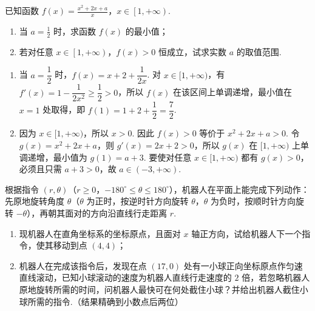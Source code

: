 \begin{problem}
已知函数 \(f(x)=\frac{x^2+2x+a}{x}\)，\(x\in\left[1,+\infty\right)\).
\begin{enumerate}
\item 当 \(a=\frac{1}{2}\) 时，求函数 \(f(x)\) 的最小值；
\item 若对任意 \(x\in\left[1,+\infty\right)\)，\(f(x)>0\) 恒成立，试求实数 \(a\) 的取值范围.
\end{enumerate}
\end{problem}

\begin{solution}
\begin{enumerate}
\item 当 \(a=\dfrac12\) 时，\(f(x)=x+2+\dfrac{1}{2x}\). 对 \(x\in[1,+\infty)\)，有 \(f'(x)=1-\dfrac{1}{2x^2}\geqslant\dfrac12>0\)，所以 \(f(x)\) 在该区间上单调递增，最小值在 \(x=1\) 处取得，即 \(f(1)=1+2+\dfrac12=\dfrac72\).
\item 因为 \(x\in[1,+\infty)\)，所以 \(x>0\). 因此 \(f(x)>0\) 等价于 \(x^2+2x+a>0\). 令 \(g(x)=x^2+2x+a\)，则 \(g'(x)=2x+2>0\)，所以 \(g(x)\) 在 \([1,+\infty)\) 上单调递增，最小值为 \(g(1)=a+3\). 要使对任意 \(x\in[1,+\infty)\) 都有 \(g(x)>0\)，必须且只需 \(a+3>0\)，故 \(a\in(-3,+\infty)\).
\end{enumerate}
\end{solution}

\begin{problem}
根据指令 \((r,\theta)\)（\(r\geqslant 0\)，\(-180^{\circ}\leqslant \theta\leqslant 180^{\circ}\)），机器人在平面上能完成下列动作：先原地旋转角度 \(\theta\)（\(\theta\) 为正时，按逆时针方向旋转 \(\theta\)，\(\theta\) 为负时，按顺时针方向旋转 \(-\theta\)），再朝其面对的方向沿直线行走距离 \(r\).
\begin{enumerate}
\item 现机器人在直角坐标系的坐标原点，且面对 \(x\) 轴正方向，试给机器人下一个指令，使其移动到点 \((4,4)\)；
\item 机器人在完成该指令后，发现在点 \((17,0)\) 处有一小球正向坐标原点作匀速直线滚动，已知小球滚动的速度为机器人直线行走速度的 \(2\) 倍，若忽略机器人原地旋转所需的时间，问机器人最快可在何处截住小球？并给出机器人截住小球所需的指令.（结果精确到小数点后两位）
\end{enumerate}
\end{problem}

